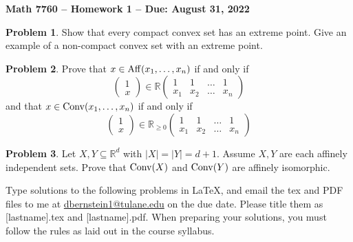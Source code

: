 \documentclass[letterpaper,11pt]{amsart}
\theoremstyle{plain}
\theoremstyle{definition}
\newtheorem{pr}{Problem}
\theoremstyle{remark}
\newcommand{\conv}{{\rm Conv}}
\newcommand{\aff}{{\rm Aff}}
\begin{document}
\Large

\begin{center}
{\bf Math 7760 -- Homework  1 --  Due:  August 31, 2022}
\end{center}

\normalsize


\medskip


\begin{pr}
    Show that every compact convex set has an extreme point. Give an example of a non-compact convex set with an extreme point.
\end{pr}


\begin{pr}
    Prove that $x \in \aff(x_1,\dots,x_n)$ if and only if
    \[
        \begin{pmatrix}
            1 \\
            x
        \end{pmatrix}
        \in
        \mathbb{R}\begin{pmatrix}
            1 & 1 & \dots & 1 \\
            x_1 & x_2 & \dots & x_n
        \end{pmatrix}
    \]
    and that $x \in \conv(x_1,\dots,x_n)$ if and only if
    \[
        \begin{pmatrix}
            1 \\
            x
        \end{pmatrix}
        \in
        \mathbb{R}_{\ge 0} \begin{pmatrix}
            1 & 1 & \dots & 1 \\
            x_1 & x_2 & \dots & x_n
        \end{pmatrix}
    \]
\end{pr}
\begin{pr}
    Let $X,Y \subseteq \mathbb{R}^d$ with $|X| = |Y| = d+1$.
    Assume $X,Y$ are each affinely independent sets.
    Prove that $\conv(X)$ and $\conv(Y)$ are affinely isomorphic.
\end{pr}



\bigskip

Type solutions to the following problems in \LaTeX, and email the tex and PDF files to me at \url{dbernstein1@tulane.edu} on the due date.
Please title them as [lastname].tex and [lastname].pdf.
When preparing your solutions, you must follow the rules as laid out in the course syllabus.
\end{document}
